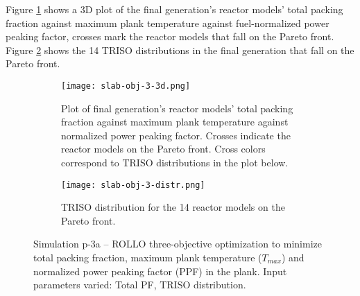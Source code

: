 Figure \ref{fig:slab-obj-3-3d} shows a 3D plot of the final generation's reactor models' 
total packing fraction against maximum plank temperature against fuel-normalized power 
peaking factor, crosses mark the reactor models that fall on the Pareto front.
Figure \ref{fig:slab-obj-3-distr} shows the 14 TRISO distributions in 
the final generation that fall on the Pareto front. 
\begin{figure}[htbp!]
    \begin{subfigure}{\textwidth}
        \centering
        \texttt{[image: slab-obj-3-3d.png]}
        \caption{Plot of final generation's reactor models' total packing fraction against maximum plank 
        temperature against normalized power peaking factor. Crosses indicate the reactor models on the 
        Pareto front. Cross colors correspond to TRISO distributions in the plot below.}
        \label{fig:slab-obj-3-3d} 
    \end{subfigure}
    \begin{subfigure}{\textwidth}
        \texttt{[image: slab-obj-3-distr.png]}
        \caption{TRISO distribution for the 14 reactor models on the Pareto front.}
        \label{fig:slab-obj-3-distr} 
    \end{subfigure}
    \caption{Simulation p-3a -- ROLLO three-objective optimization to minimize total packing fraction, 
    maximum plank temperature ($T_{max}$) and normalized power peaking factor (PPF) in the plank. 
    Input parameters varied: Total PF, TRISO distribution.}
    \label{fig:slab-obj-3}
\end{figure}

